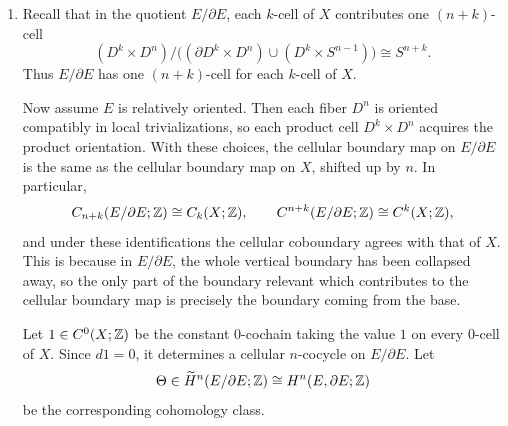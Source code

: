 \documentclass[12pt]{article}  %
\begin{document}
\begin{solution}
\begin{enumerate}
If $\gamma_0$ and $\gamma_1$ are homotopic rel endpoints, then pulling back the bundle along the homotopy $H:[0,1]^2\to X$ gives a trivial bundle over the square.
Using a trivialization that preserves the orientation over $(0,0)$ shows that the transported orientations along $\gamma_0$ and $\gamma_1$ agree.
Hence the transported orientation depends only on the homotopy class of the path.

Since $\pi_1(X)=0$, any two paths with the same endpoints are homotopic rel endpoints.
Therefore the transported orientation is independent of path and defines a well-defined orientation on every fiber.

Finally, over a sufficiently small trivializing neighborhood $U\subset X$,
the transported orientations correspond to a constant choice of generator in
\[
H^n(D^n,S^{n-1})\cong \mathbb Z.
\]
Thus there exists an open cover $\{U_\alpha\}$ of $X$ and trivializations of pairs
\[
\phi_\alpha:
(p^{-1}(U_\alpha),\partial E\cap p^{-1}(U_\alpha))
\xrightarrow{\cong}
(U_\alpha\times D^n,\ U_\alpha\times S^{n-1})
\]
such that on overlaps $U_{\alpha\beta}$ the transition maps
$\phi_\beta\circ\phi_\alpha^{-1}$
are fiberwise orientation-preserving homeomorphisms of $(D^n,S^{n-1})$.
This proves relative orientability.

\item 
Recall that in the quotient $E/\partial E$, each $k$-cell of $X$ contributes one
$(n+k)$-cell
\[
(D^k\times D^n)\big/\bigl((\partial D^k\times D^n)\cup(D^k\times S^{n-1})\bigr)
\cong S^{n+k}.
\]
Thus $E/\partial E$ has one $(n+k)$-cell for each $k$-cell of $X$.

Now assume $E$ is relatively oriented. Then each fiber $D^n$ is oriented compatibly in local trivializations, so each product cell $D^k\times D^n$ acquires the product orientation. With these choices, the cellular boundary map on $E/\partial E$ is the same as the cellular boundary map on $X$, shifted up by $n$. In particular,
\[
C_{n+k}(E/\partial E;\mathbb{Z})\cong C_k(X;\mathbb{Z}),
\qquad
C^{n+k}(E/\partial E;\mathbb{Z})\cong C^k(X;\mathbb{Z}),
\]
and under these identifications the cellular coboundary agrees with that of $X$. This is because in $E/\partial E$, the whole vertical boundary has been collapsed away, so the only part of the boundary relevant which contributes to the cellular boundary map is precisely the boundary coming from the base.

Let $1\in C^0(X;\mathbb{Z})$ be the constant $0$-cochain taking the value $1$ on every
$0$-cell of $X$. Since $d1=0$, it determines a cellular $n$-cocycle on
$E/\partial E$. Let
\[
\Theta\in \widetilde H^n(E/\partial E;\mathbb{Z})\cong H^n(E,\partial E;\mathbb{Z})
\]
be the corresponding cohomology class.


\end{enumerate}
\end{solution}
\end{document}
